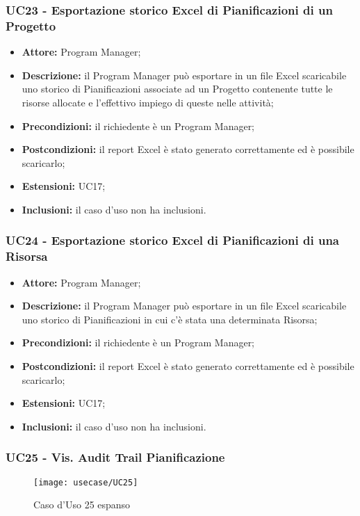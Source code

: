 \subsubsection*{UC23 - Esportazione storico Excel di Pianificazioni di un Progetto}
\begin{itemize}[label=$\circ$]
\item \textbf{Attore:} Program Manager;
\item \textbf{Descrizione:} il Program Manager può esportare in un file Excel scaricabile uno storico di Pianificazioni associate ad un Progetto contenente tutte le risorse allocate e l’effettivo impiego di queste nelle attività;
\item \textbf{Precondizioni:} il richiedente è un Program Manager;
\item \textbf{Postcondizioni:} il report Excel è stato generato correttamente ed è possibile
scaricarlo;
\item \textbf{Estensioni:} UC17;
\item \textbf{Inclusioni:} il caso d'uso non ha inclusioni.
\end{itemize}

\subsubsection*{UC24 - Esportazione storico Excel di Pianificazioni di una Risorsa}
\begin{itemize}[label=$\circ$]
\item \textbf{Attore:} Program Manager;
\item \textbf{Descrizione:} il Program Manager può esportare in un file Excel scaricabile uno storico di Pianificazioni in cui c'è stata una determinata Risorsa;
\item \textbf{Precondizioni:} il richiedente è un Program Manager;
\item \textbf{Postcondizioni:} il report Excel è stato generato correttamente ed è possibile
scaricarlo;
\item \textbf{Estensioni:} UC17;
\item \textbf{Inclusioni:} il caso d'uso non ha inclusioni.
\end{itemize}

\subsubsection*{UC25 - Vis. Audit Trail Pianificazione}
\begin{figure}[H] 
	\centering
    \texttt{[image: usecase/UC25]} 
    \caption{Caso d'Uso 25 espanso}
\end{figure}

